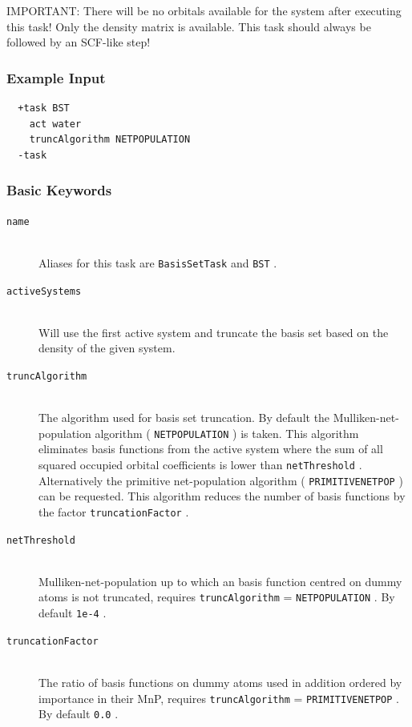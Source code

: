 \documentclass[bibliography=totocnumbered,a4paper,10pt,oneside]{scrbook}
\newcommand{\ttt}[1]{%
  \begingroup\setlength{\fboxsep}{1pt}%
  \colorbox{serenity-green!30}{\texttt{\hspace*{2pt}\vphantom{(g}#1\hspace*{2pt}}}%
  \endgroup
}
\begin{document}
{\color{red}IMPORTANT:} There will be no orbitals available for the system after executing this
task! Only the density matrix is available. This task should always be followed by an SCF-like step!
\subsubsection{Example Input}
\begin{lstlisting}
  +task BST
    act water
    truncAlgorithm NETPOPULATION
  -task
\end{lstlisting}
\subsubsection{Basic Keywords}
\begin{description}
  \item [\texttt{name}]\hfill \\
    Aliases for this task are \ttt{BasisSetTask} and \ttt{BST}.
  \item [\texttt{activeSystems}]\hfill \\
    Will use the first active system and truncate the basis set based on the density of the given system.
  \item [\texttt{truncAlgorithm}]\hfill \\
    The algorithm used for basis set truncation. By default the Mulliken-net-population
    algorithm (\ttt{NETPOPULATION}) is taken. This algorithm eliminates basis functions from the active
    system where the sum of all squared occupied orbital coefficients is lower than \ttt{netThreshold}.
    Alternatively the primitive net-population algorithm (\ttt{PRIMITIVENETPOP}) can be requested. This
    algorithm reduces the number of basis functions by the factor \ttt{truncationFactor}.
  \item[\texttt{netThreshold}] \hfill \\
    Mulliken-net-population up to which an basis function centred on dummy atoms is not truncated, requires
    \ttt{truncAlgorithm}=\ttt{NETPOPULATION}. By default \ttt{1e-4}.
  \item[\texttt{truncationFactor}] \hfill \\
    The ratio of basis functions on dummy atoms used in addition ordered by importance in their MnP, requires
    \ttt{truncAlgorithm}=\ttt{PRIMITIVENETPOP}. By default \ttt{0.0}.
\end{description}
\end{document}
